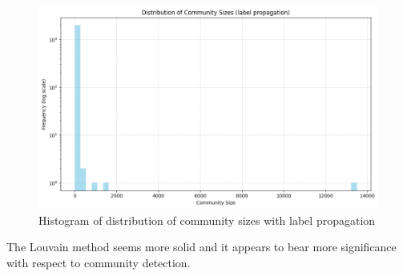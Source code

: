 \documentclass[12pt]{article}
\begin{document}
\begin{figure}[h]
	\centering
	\includegraphics[width=0.6\linewidth]{screenshot011}
	\caption{Histogram of distribution of community sizes with label propagation}
	\label{fig:screenshot011}
\end{figure}
The Louvain method seems more solid and it appears to bear more significance with respect to community detection.
\end{document}
